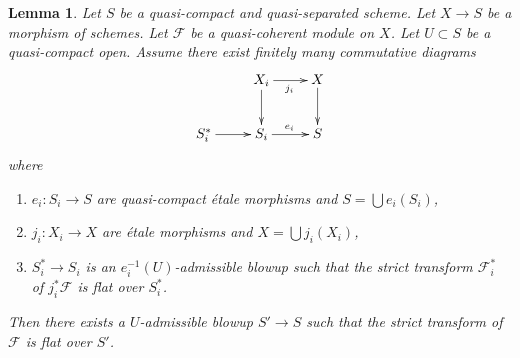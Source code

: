 \documentclass{amsart}
\theoremstyle{plain}
\newtheorem{lemma}[subsection]{Lemma}
\theoremstyle{definition}
\theoremstyle{remark}
\numberwithin{equation}{subsection}
\begin{document}
\begin{lemma}
\label{lemma-flatten-module-etale-localize}
Let $S$ be a quasi-compact and quasi-separated scheme.
Let $X \to S$ be a morphism of schemes.
Let $\mathcal{F}$ be a quasi-coherent module on $X$.
Let $U \subset S$ be a quasi-compact open.
Assume there exist finitely many commutative diagrams
$$
\xymatrix{
& X_i \ar[r]_{j_i} \ar[d] & X \ar[d] \\
S_i^* \ar[r] & S_i \ar[r]^{e_i} & S
}
$$
where
\begin{enumerate}
\item $e_i : S_i \to S$ are quasi-compact \'etale morphisms and
$S = \bigcup e_i(S_i)$,
\item $j_i : X_i \to X$ are \'etale morphisms and
$X = \bigcup j_i(X_i)$,
\item $S^*_i \to S_i$ is an $e_i^{-1}(U)$-admissible blowup
such that the strict transform $\mathcal{F}_i^*$ of $j_i^*\mathcal{F}$
is flat over $S^*_i$.
\end{enumerate}
Then there exists a $U$-admissible blowup $S' \to S$ such that
the strict transform of $\mathcal{F}$ is flat over $S'$.
\end{lemma}
\end{document}
